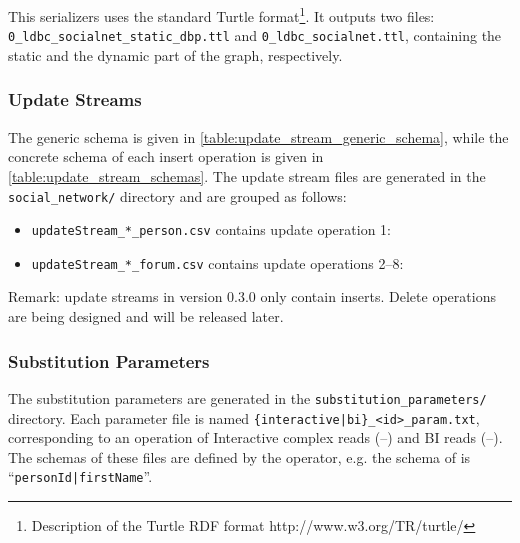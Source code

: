 This serializers uses the standard Turtle format\footnote{Description of
the Turtle RDF format http://www.w3.org/TR/turtle/}. It outputs
two files: \texttt{0\_ldbc\_socialnet\_static\_dbp.ttl} and \texttt{0\_ldbc\_socialnet.ttl}, containing the static and the dynamic part of the graph, respectively.

\subsubsection{Update Streams}



The generic schema is given in \autoref{table:update_stream_generic_schema}, while the concrete schema of each insert operation is given in \autoref{table:update_stream_schemas}.
The update stream files are generated in the \texttt{social\_network/} directory and are grouped as follows:

\begin{itemize}
    \item \texttt{updateStream\_*\_person.csv} contains update operation 1: 
    \item \texttt{updateStream\_*\_forum.csv} contains update operations 2--8: %
\end{itemize}

Remark: update streams in version 0.3.0 only contain inserts. Delete operations are being designed and will be released later.

\subsubsection{Substitution Parameters}

The substitution parameters are generated in the \texttt{substitution\_parameters/} directory.
Each parameter file is named \texttt{\{interactive|bi\}\_<id>\_param.txt}, corresponding to an operation of
Interactive complex reads (--) and
BI reads (--).
The schemas of these files are defined by the operator, e.g. the schema of  is ``\texttt{personId|firstName}''.

